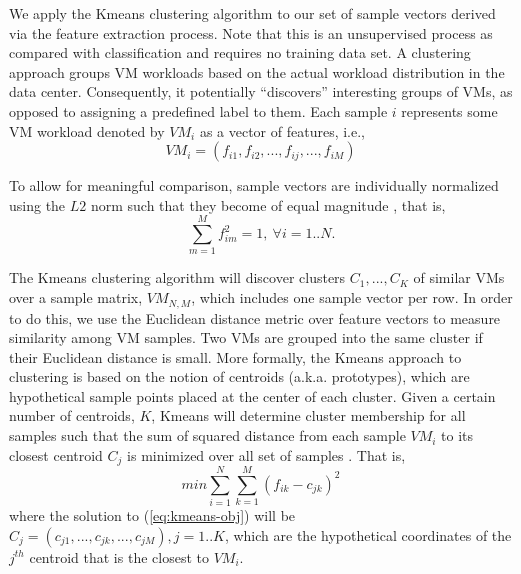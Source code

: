 \documentclass[10pt, conference, compsocconf]{IEEEtran}
\begin{document}
We apply the Kmeans clustering algorithm \cite{kmeans1} to our set of sample vectors derived via the feature extraction process. Note that this is an unsupervised process as compared with classification and requires no training data set. A clustering approach groups VM workloads based on the actual workload distribution in the data center. Consequently, it potentially ``discovers'' interesting groups of VMs, as opposed to assigning a predefined label to them. Each sample $i$ represents some VM workload denoted by $VM_i$ as a vector of features, i.e.,  
%
\begin{equation}
VM_i = (f_{i1},f_{i2},...,f_{ij},...,f_{iM})
\label{eq:sample-vector}
\end{equation}

To allow for meaningful comparison, sample vectors are individually normalized using the $L2$ norm such that they become of equal magnitude \cite{Kmeans2}, that is,
%
\begin{equation}
\sum_{m=1}^{M} f_{im}^2 = 1,~\forall i=1..N.
\label{eq:l2-norm} 
\end{equation}

The Kmeans clustering algorithm will discover clusters $C_1,...,C_K$ of similar VMs over a sample matrix, $VM_{N,M}$, which includes one sample vector per row. In order to do this, we use the Euclidean distance metric over feature vectors to measure similarity among VM samples. Two VMs are grouped into the same cluster if their Euclidean distance is small. More formally, the Kmeans approach to clustering is based on the notion of centroids (a.k.a. prototypes), which are hypothetical sample points placed at the center of each cluster. Given a certain number of centroids, $K$, Kmeans will determine cluster membership for all samples such that the sum of squared distance from each sample $VM_i$ to its closest centroid $C_j$ is minimized over all set of samples \cite{kmeans3}. That is,
%
\begin{equation}
min \sum_{i=1}^{N} \sum_{k=1}^{M} (f_{ik} - c_{jk})^2 \label{eq:kmeans-obj}
\label{eq:kmeans-obj}
\end{equation}
%
where the solution to (\ref{eq:kmeans-obj}) will be $C_j = (c_{j1},...,c_{jk},...,c_{jM}), j=1..K$, which are the hypothetical coordinates of the $j^{th}$ centroid that is the closest to $VM_i$.
\end{document}
